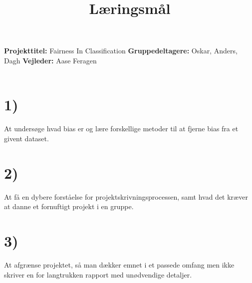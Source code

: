 \documentclass[11pt, fleqn]{article}
\title{Læringsmål}
\date{}
\begin{document}
	\maketitle
	\noindent
	\vspace*{-1.4cm}
	\noindent
	\textbf{Projekttitel:} Fairness In Classification \newline \noindent
	\textbf{Gruppedeltagere:} Oskar, Anders, Dagh \newline  \noindent
	\textbf{Vejleder:} Aase Feragen \noindent
	\\\\
	\section*{1)}
	At undersøge hvad bias er og lære forskellige metoder til at fjerne bias fra et givent dataset.
	\section*{2)}
	At få en dybere forståelse for projektskrivningsprocessen, samt hvad det kræver at danne et fornuftigt projekt i en gruppe.
	
	\section*{3)}
	At afgrænse projektet, så man dækker emnet i et passede omfang men ikke skriver en for langtrukken rapport med unødvendige detaljer.
	
\end{document}

